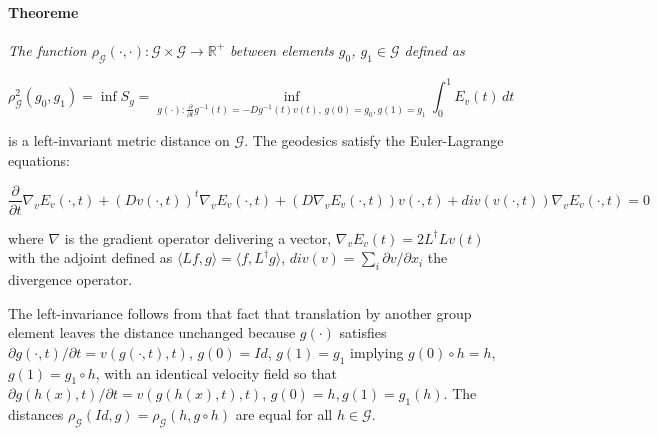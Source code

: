 \documentclass[preprint,review,8pt,times]{elsarticle}
\begin{document}
\paragraph{Theoreme}{\it The function $\rho_{\mathcal{G}}(\cdot, \cdot): \mathcal{G} \times \mathcal{G} \rightarrow \mathbb{R}^{+}$ between elements $g_{0}$, $g_{1} \in \mathcal{G}$ defined as

$$
\rho_{\mathcal{G}}^{2}(g_{0}, g_{1}) = \inf S_{g} = \underset{g(\cdot):\frac{\partial}{\partial t}g^{-1}(t) = -Dg^{-1}(t)v(t),\, g(0)=g_{0}, g(1) = g_{1}}{\inf} \int_{0}^{1} E_{v}(t) \, dt 
$$

is a left-invariant metric distance on $\mathcal{G}$. The geodesics satisfy the Euler-Lagrange equations:

$$
\frac{\partial}{\partial t} \nabla_{v}E_{v}(\cdot, t) + (Dv(\cdot, t))^{t} \nabla_{v}E_{v}(\cdot, t) + (D \nabla_{v}E_{v}(\cdot, t))v(\cdot, t) + div( v(\cdot, t)) \nabla_{v}E_{v}(\cdot, t) = 0
$$

where $\nabla$ is the gradient operator delivering a vector, $\nabla_{v}E_{v}(t) = 2L^{\dag}Lv(t)$ with the adjoint defined as $\langle Lf, g\rangle = \langle f, L^{\dag}g \rangle$, $div(v) = \sum_{i} \partial v/ \partial x_{i}$ the divergence operator.\\
}

The left-invariance follows from that fact that translation by another group element leaves the distance unchanged because $g(\cdot)$ satisfies $\partial g(\cdot, t) / \partial t = v(g(\cdot, t), t)$, $g(0) = Id$, $g(1) = g_{1}$ implying $g(0) \circ h = h$, $g(1) = g_{1} \circ h$, with an identical velocity field so that $\partial g(h(x),t)/\partial t = v(g(h(x),t),t)$, $g(0) = h, g(1) = g_{1}(h)$. The distances $\rho_{\mathcal{G}}(Id, g) = \rho_{\mathcal{G}}(h, g \circ h)$ are equal for all $h \in \mathcal{G}$.
\end{document}
